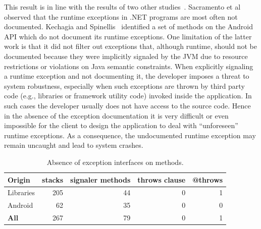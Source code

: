 This result is in line with the results of two other studies~\cite{sacramento2006unchecked,kechagia2014}. 
Sacramento et al~\cite{sacramento2006unchecked} observed that the
runtime exceptions in .NET programs are most often not documented. 
Kechagia and Spinellis~\cite{kechagia2014} identified a set of methods 
on the Android API which do not document its runtime exceptions. One limitation 
of the latter work is that it did not filter out exceptions that,  
although runtime, should not be documented because they were implicitly signaled by the 
JVM due to resource restrictions or violations on Java semantic constraints.
When explicitly signaling a runtime exception and not documenting it, 
the developer imposes a threat to system robustness, especially
when such exceptions are thrown by third party code (e.g., libraries or framework utility code)
 invoked inside the application. In such cases the developer usually does not have access to 
the source code. Hence in the absence of the exception documentation it is very difficult or even impossible
 for the client to design the application to deal with ``unforeseen'' runtime exceptions. As a consequence, the
 undocumented runtime exception may remain uncaught and lead to system crashes.

\bigskip


\bigskip

\begin{table}
\scriptsize
\centering

\begin{tabular}{lrrrr}
    \hline
 \bfseries{Origin}   &  \bfseries{stacks}  & \bfseries{signaler methods} &  \bfseries{throws clause}  &  \bfseries{@throws}  \\ 
\hline					
Libraries	& 	205	 & 	44	& 0	& 1	\\
Android  	&	62 &	35	&0 &  0	\\					
\hline					
\bfseries{All}	&	267 &	79 &  0  & 1\\
\hline					
  \end{tabular}
\caption{Absence of exception interfaces on methods.}
\label{tab:runtimeinterface}
\end{table}


